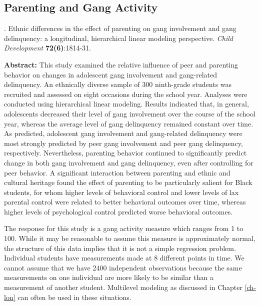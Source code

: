 \documentclass[
]{krantz}
\renewenvironment{quote}{\begin{VF}}{\end{VF}}
\begin{document}
\hypertarget{parenting-and-gang-activity}{%
\subsection{Parenting and Gang Activity}\label{parenting-and-gang-activity}}

\citet{Walker-Barnes2001} . Ethnic differences in the effect of parenting on gang involvement and gang delinquency: a longitudinal, hierarchical linear modeling perspective. \emph{Child Development} \textbf{72(6)}:1814-31.

\begin{quote}
\textbf{Abstract:} This study examined the relative influence of peer and parenting behavior on changes in adolescent gang involvement and gang-related delinquency. An ethnically diverse sample of 300 ninth-grade students was recruited and assessed on eight occasions during the school year. Analyses were conducted using hierarchical linear modeling. Results indicated that, in general, adolescents decreased their level of gang involvement over the course of the school year, whereas the average level of gang delinquency remained constant over time. As predicted, adolescent gang involvement and gang-related delinquency were most strongly predicted by peer gang involvement and peer gang delinquency, respectively. Nevertheless, parenting behavior continued to significantly predict change in both gang involvement and gang delinquency, even after controlling for peer behavior. A significant interaction between parenting and ethnic and cultural heritage found the effect of parenting to be particularly salient for Black students, for whom higher levels of behavioral control and lower levels of lax parental control were related to better behavioral outcomes over time, whereas higher levels of psychological control predicted worse behavioral outcomes.
\end{quote}

The response for this study is a gang activity measure which ranges from 1 to 100. While it may be reasonable to assume this measure is approximately normal, the structure of this data implies that it is not a simple regression problem. Individual students have measurements made at 8 different points in time. We cannot assume that we have 2400 independent observations because the same measurements on one individual are more likely to be similar than a measurement of another student. Multilevel modeling as discussed in Chapter \ref{ch-lon} can often be used in these situations.
\end{document}
